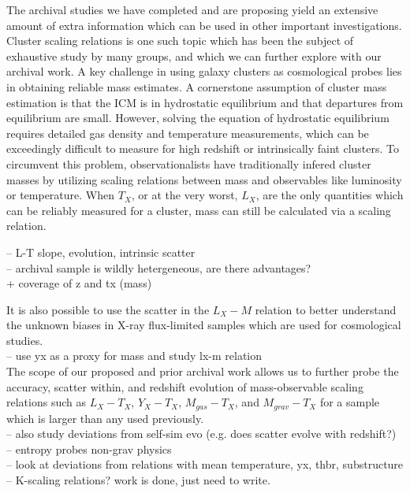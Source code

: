 \documentclass[letterpaper,11pt]{article}
\begin{document}
The archival studies we have completed and are proposing yield an
extensive amount of extra information which can be used in other
important investigations. Cluster scaling relations is one such topic
which has been the subject of exhaustive study by many groups, and
which we can further explore with our archival work. A key challenge
in using galaxy clusters as cosmological probes lies in obtaining
reliable mass estimates. A cornerstone assumption of cluster mass
estimation is that the ICM is in hydrostatic equilibrium and that
departures from equilibrium are small. However, solving the equation
of hydrostatic equilibrium requires detailed gas density and
temperature measurements, which can be exceedingly difficult to
measure for high redshift or intrinsically faint clusters. To
circumvent this problem, observationalists have traditionally infered
cluster masses by utilizing scaling relations between mass and
observables like luminosity or temperature. When $T_X$, or at the very
worst, $L_X$, are the only quantities which can be reliably measured
for a cluster, mass can still be calculated via a scaling relation.

-- L-T slope, evolution, intrinsic scatter\\
-- archival sample is wildly hetergeneous, are there advantages?\\
       + coverage of z and tx (mass)

It is also possible to use the scatter in the $L_X-M$ relation to
better understand the unknown biases in X-ray flux-limited samples
which are used for cosmological studies.\\

-- use yx as a proxy for mass and study lx-m relation\\

The scope of our proposed and prior archival work allows us to further
probe the accuracy, scatter within, and redshift evolution of
mass-observable scaling relations such as $L_X-T_X$, $Y_X-T_X$,
$M_{gas}-T_X$, and $M_{grav}-T_X$ for a sample which is larger than
any used previously.\\

-- also study deviations from self-sim evo (e.g. does scatter evolve with redshift?)\\

-- entropy probes non-grav physics\\
-- look at deviations from relations with mean temperature, yx, thbr, substructure\\
-- K-scaling relations? work is done, just need to write.
\end{document}
